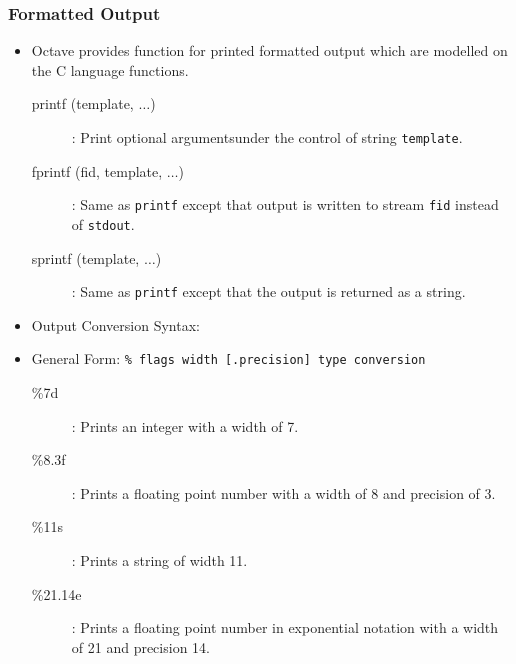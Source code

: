 \documentclass[slidestop,mathserif,compress,xcolor=svgnames]{beamer}
\begin{document}
\begin{frame}[fragile]
  \frametitle{\small Formatted Output}
  \begin{itemize}
    \item Octave provides function for printed formatted output which are modelled on the C language functions.
    \begin{description}
      \item[printf (template, $\dots$)]: Print optional argumentsunder the control of string \texttt{template}.
      \item[fprintf (fid, template, $\dots$)]: Same as \texttt{printf} except that output is written to stream \texttt{fid} instead of \texttt{stdout}.
      \item[sprintf (template, $\dots$)]: Same as \texttt{printf} except that the output is returned as a string.
    \end{description}
    \item Output Conversion Syntax:
    \item[] General Form: \texttt{\% flags width [.precision] type conversion}
    \begin{description}
      \item[\%7d]: Prints an integer with a width of 7.
      \item[\%8.3f]: Prints a floating point number with a width of 8 and precision of 3.
      \item[\%11s]: Prints a string of width 11.
      \item[\%21.14e]: Prints a floating point number in exponential notation with a width of 21 and precision 14.
    \end{description}
  \end{itemize}
\end{frame}
\end{document}
